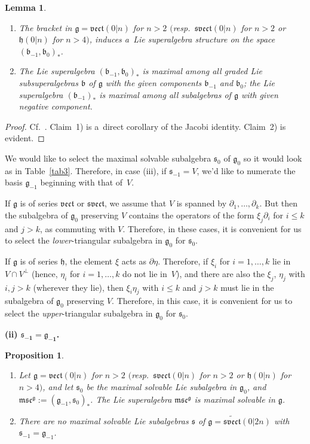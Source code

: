 \documentclass[pdftex]{sigma}
\newcommand{\del}{\partial}
\newcommand {\fb} {{\mathfrak{b}}}
\newcommand {\fc} {{\mathfrak{c}}}
\newcommand {\fg} {{\mathfrak{g}}} %
\newcommand {\fh} {{\mathfrak{h}}}
\newcommand {\fm} {{\mathfrak{m}}}
\newcommand {\fs} {{\mathfrak{s}}}
\newcommand {\fsvect} {{\mathfrak{svect}}}
\newcommand {\fvect} {{\mathfrak{vect}}} %
\newcommand {\<} [2] {{\left.\vphantom{#2}\right.^{#1\!}\!{#2}}}
\numberwithin{equation}{section}
\newtheorem{Lemma}[Theorem]{Lemma}
\newtheorem{Proposition}[Theorem]{Proposition}
\begin{document}
\begin{Lemma}\label{L3} \quad\samepage
\begin{enumerate}\itemsep=0pt
\item[$1)$] The bracket in $\fg=\fvect(0|n)$ for $n> 2$ $($resp.\ $\fsvect(0|n)$ for $n>2$ or $\fh(0|n)$ for $n> 4)$, induces a~Lie superalgebra structure on the space $(\fb_{-1}, \fb_{0})_*$.

\item[$2)$] The Lie superalgebra $(\fb_{-1}, \fb_{0})_*$
is maximal among all graded Lie subsuperalgebras $\fb$ of $\fg$ with the given components $\fb_{-1}$ and $\fb_{0}$; the Lie superalgebra $(\fb_{-1})_*$ is maximal among all subalgebras of $\fg$ with given negative component.
\end{enumerate}
 \end{Lemma}

\begin{proof} Cf.~\cite{BLM}. Claim~1) is a~direct corollary of the Jacobi identity. Claim~2) is evident. \end{proof}

We would like to select the maximal solvable subalgebra $\fs_0$ of $\fg_0$ so it would
look as in Table~\ref{tab3}. Therefore, in case (iii), if $\fs_{-1}= V$, we'd like to numerate the basis $\fg_{-1}$ beginning with that of~$V$.

If $\fg$ is of series $\fvect$ or $\fsvect$, we assume that $V$ is spanned by $\del_1, \dots , \del_k$. But then the subalgebra of $\fg_0$ preserving $V$ contains the operators of the form $\xi_j\del_i$ for $i\le k$ and $j>k$, as commuting with $V$. Therefore, in these cases, it is convenient for us to select the \textit{lower}-triangular subalgebra in $\fg_0$ for $\fs_0$.

If $\fg$ is of series $\fh$, the element $\xi$ acts as $\del \eta$. Therefore, if $\xi_i$ for $i=1,\dots ,k$ lie in $V\cap V^\perp$ (hence, $\eta_i$ for $i=1,\dots ,k$ do not lie in~$V$), and there are also the $\xi_j$, $\eta_j$ with $i, j >k$ (wherever they lie), then $\xi_i\eta_j$ with $i\le k$ and $j>k$ must lie in the subalgebra of $\fg_0$ preserving $V$. Therefore, in this case, it is convenient for us to select the \textit{upper}-triangular subalgebra in $\fg_0$ for $\fs_0$.

{\bf (ii) $\boldsymbol{\fs_{-1}=\fg_{-1}}$.}

\begin{Proposition}\label{P2}\quad
\begin{enumerate}\itemsep=0pt
\item[$1)$] Let $\fg=\fvect(0|n)$ for $n> 2$ $($resp.\ $\fsvect(0|n)$ for $n>2$ or $\fh(0|n)$ for $n> 4)$, and let $\fs_0$ be the maximal solvable Lie subalgebra in $\fg_0$, and $\fm\fs\fc^\fg:=(\fg_{-1}, \fs_0)_*$.
The Lie superalgebra $\fm\fs\fc^\fg$ is maximal solvable in $\fg$.
\item[$2)$] There are no maximal solvable Lie subalgebras $\fs$ of $\fg=\widetilde \fsvect(0|2n)$ with $\fs_{-1}=\fg_{-1}$.
\end{enumerate}
\end{Proposition}
\end{document}
